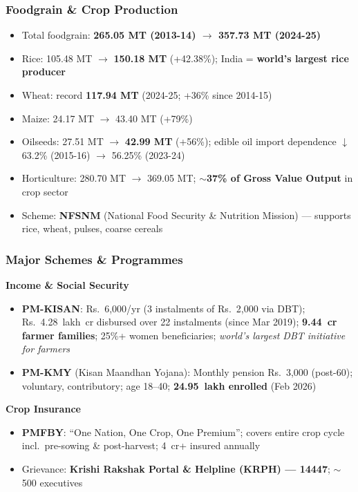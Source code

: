\subsubsection*{Foodgrain \& Crop Production}
\begin{itemize}
  \item Total foodgrain: \textbf{265.05 MT (2013-14) $\to$ 357.73 MT (2024-25)}
  \item Rice: 105.48 MT $\to$ \textbf{150.18 MT} (+42.38\%); India = \textbf{world's largest rice producer}
  \item Wheat: record \textbf{117.94 MT} (2024-25; +36\% since 2014-15)
  \item Maize: 24.17 MT $\to$ 43.40 MT (+79\%)
  \item Oilseeds: 27.51 MT $\to$ \textbf{42.99 MT} (+56\%); edible oil import dependence $\downarrow$ 63.2\% (2015-16) $\to$ 56.25\% (2023-24)
  \item Horticulture: 280.70 MT $\to$ 369.05 MT; $\sim$\textbf{37\% of Gross Value Output} in crop sector
  \item Scheme: \textbf{NFSNM} (National Food Security \& Nutrition Mission) --- supports rice, wheat, pulses, coarse cereals
\end{itemize}

\subsubsection*{Major Schemes \& Programmes}

\textbf{Income \& Social Security}
\begin{itemize}
  \item \textbf{PM-KISAN}: Rs.~6,000/yr (3 instalments of Rs.~2,000 via DBT); Rs.~4.28~lakh~cr disbursed over 22 instalments (since Mar 2019); \textbf{9.44~cr farmer families}; 25\%+ women beneficiaries; \textit{world's largest DBT initiative for farmers}
  \item \textbf{PM-KMY} (Kisan Maandhan Yojana): Monthly pension Rs.~3,000 (post-60); voluntary, contributory; age 18--40; \textbf{24.95~lakh enrolled} (Feb 2026)
\end{itemize}

\textbf{Crop Insurance}
\begin{itemize}
  \item \textbf{PMFBY}: ``One Nation, One Crop, One Premium''; covers entire crop cycle incl.\ pre-sowing \& post-harvest; 4~cr+ insured annually
  \item Grievance: \textbf{Krishi Rakshak Portal \& Helpline (KRPH) --- 14447}; $\sim$500 executives
\end{itemize}

